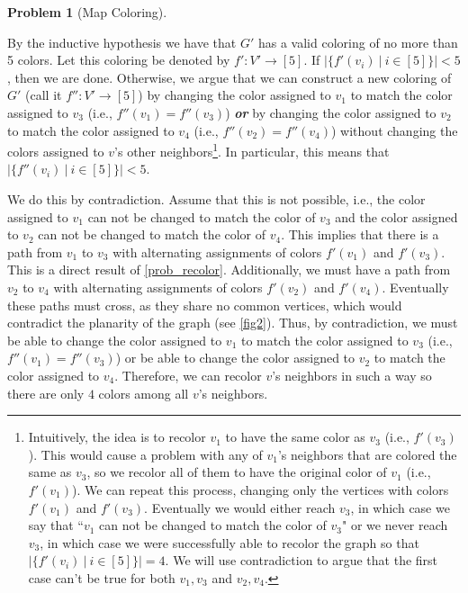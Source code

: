\documentclass{article}
\theoremstyle{plain}
\theoremstyle{definition}
\newtheorem{problem}{Problem}
\newcommand{\ra}{\rightarrow}
\begin{document}
\begin{problem}[Map Coloring]
\begin{enumerate}
\begin{enumerate}
\begin{solution}
                By the inductive hypothesis we have that \(G'\) has a valid coloring of no more than 5 colors. Let this coloring be denoted by \(f' : V' \ra [5]\). If \(|\{f'(v_i)\ |\ i\in[5]\}| < 5\), then we are done. Otherwise, we argue that we can construct a new coloring of \(G'\) (call it \(f'': V' \ra [5]\)) by changing the color assigned to \(v_1\) to match the color assigned to \(v_3\) (i.e., \(f''(v_1) = f''(v_3)\)) \textbf{\emph{or}} by changing the color assigned to \(v_2\) to match the color assigned to \(v_4\) (i.e., \(f''(v_2) = f''(v_4)\)) without changing the colors assigned to \(v\)'s other neighbors\footnote{Intuitively, the idea is to recolor \(v_1\) to have the same color as \(v_3\) (i.e., \(f'(v_3)\)). This would cause a problem with any of \(v_1\)'s neighbors that are colored the same as \(v_3\), so we recolor all of them to have the original color of \(v_1\) (i.e., \(f'(v_1)\)). We can repeat this process, changing only the vertices with colors \(f'(v_1)\) and \(f'(v_3)\). Eventually we would either reach \(v_3\), in which case we say that ``\(v_1\) can not be changed to match the color of \(v_3\)" or we never reach \(v_3\), in which case we were successfully able to recolor the graph so that \(|\{f'(v_i)\ |\ i\in[5]\}| = 4\). We will use contradiction to argue that the first case can't be true for both \(v_1,v_3\) and \(v_2,v_4\).}. In particular, this means that \(|\{f''(v_i)\ |\ i\in[5]\}| < 5\). 
                
                We do this by contradiction. Assume that this is not possible, i.e., the color assigned to \(v_1\) can not be changed to match the color of \(v_3\) and the color assigned to \(v_2\) can not be changed to match the color of \(v_4\). This implies that there is a path from \(v_1\) to \(v_3\) with alternating assignments of colors \(f'(v_1)\) and \(f'(v_3)\). This is a direct result of \cref{prob_recolor}.
                Additionally, we must have a path from \(v_2\) to \(v_4\) with alternating assignments of colors \(f'(v_2)\) and \(f'(v_4)\). Eventually these paths must cross, as they share no common vertices, which would contradict the planarity of the graph (see \cref{fig2}). Thus, by contradiction, we must be able to change the color assigned to \(v_1\) to match the color assigned to \(v_3\) (i.e., \(f''(v_1) = f''(v_3)\)) or be able to change the color assigned to \(v_2\) to match the color assigned to \(v_4\). Therefore, we can recolor \(v\)'s neighbors in such a way so there are only \(4\) colors among all \(v\)'s neighbors. 
    

\end{solution}
\end{enumerate}
\end{enumerate}
\end{problem}
\end{document}
